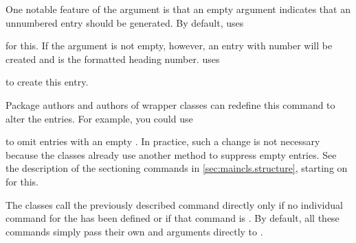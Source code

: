 One notable feature of the  argument is that an empty argument
indicates that an unnumbered entry should be generated. By default,
\KOMAScript{} uses
\begin{quote}
\end{quote}
for this. If the argument is not empty, however, an entry with number
will be created and  is the formatted heading
number. \KOMAScript{} uses
\begin{quote}\raggedright
\end{quote}
to create this entry.

Package authors and authors of wrapper classes can redefine this command to
alter the entries. For example, you could use
\begin{lstcode}
  \renewcommand{\addtocentrydefault}[3]{%
    \Ifstr{#3}{}{%
      \Ifstr{#2}{}{%
        \addcontentsline{toc}{#1}{#3}%
      }{%
        \addcontentsline{toc}{#1}{\protect\numberline{#2}#3}%
      }%
    }%
  }%
\end{lstcode}
to omit entries with an empty . In practice,
such a change is not necessary because the \KOMAScript{} classes already use
another method to suppress empty entries. See the description of the
sectioning commands in \autoref{sec:maincls.structure}, starting on
 for this.%
%
\EndIndexGroup


\begin{Declaration}
\end{Declaration}%
The \KOMAScript{} classes call the previously described
command
%
 directly only if no
individual command for the  has been defined or if that command
is . By default, all
these commands simply pass their own  and arguments directly to
.%
%
\EndIndexGroup


